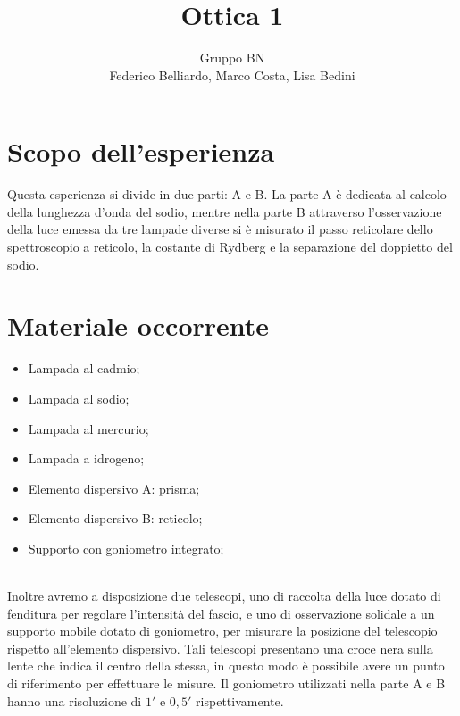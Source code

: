 \documentclass[10pt,a4paper]{article}
\author{Gruppo BN \\ Federico Belliardo, Marco Costa, Lisa Bedini}
\title{Ottica 1}
\begin{document}
\maketitle
\section{Scopo dell'esperienza}
Questa esperienza si divide in due parti: A e B.
La parte A è dedicata al calcolo della lunghezza d'onda del sodio, mentre nella parte B attraverso l'osservazione della luce emessa da tre lampade diverse si è misurato il passo reticolare dello spettroscopio a reticolo, la costante di Rydberg e la separazione del doppietto del sodio.

\section{Materiale occorrente}
\begin{itemize}
\item Lampada al cadmio;
\item Lampada al sodio;
\item Lampada al mercurio;
\item Lampada a idrogeno;
\item Elemento dispersivo A: prisma;
\item Elemento dispersivo B: reticolo;
\item Supporto con goniometro integrato;
\end{itemize}
\\
Inoltre avremo a disposizione due telescopi, uno di raccolta della luce dotato di fenditura per regolare l'intensità del fascio, e uno di osservazione solidale a un supporto mobile dotato di goniometro, per misurare la posizione del telescopio rispetto all'elemento dispersivo. Tali telescopi presentano una croce nera sulla lente che indica il centro della stessa, in questo modo è possibile avere un punto di riferimento per effettuare le misure.
Il goniometro utilizzati nella parte A e B hanno una risoluzione di $1'$ e $0,5 '$ rispettivamente.
\end{document}

